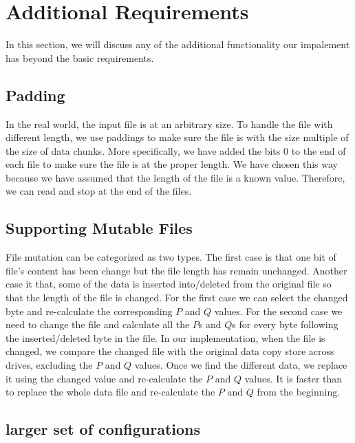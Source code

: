 \section{Additional Requirements}

In this section, we will discuss any of the additional functionality our impalement has beyond the basic requirements. 

\subsection{Padding}

In the real world, the input file is at an arbitrary size. To handle the file with different length, we use paddings to make sure the file is with the size multiple of the size of data chunks. More specifically, we have added the bits 0 to the end of each file to make sure the file is at the proper length. We have chosen this way because we have assumed that the length of the file is a known value. Therefore, we can read and stop at the end of the files. 

\subsection{Supporting Mutable Files}

File mutation can be categorized as two types. The first case is that one bit of file’s content has been change but the file length has remain unchanged. Another case it that, some of the data is inserted into/deleted from the original file so that the length of the file is changed. For the first case we can select the changed byte and re-calculate the corresponding $P$ and $Q$ values. For the second case we need to change the file and calculate all the $P$s and $Q$s for every byte following the inserted/deleted byte in the file.
In our implementation, when the file is changed, we compare the changed file with the original data copy store across drives, excluding the $P$ and $Q$ values. Once we find the different data, we replace it using the changed value and re-calculate the $P$ and $Q$ values. It is faster than to replace the whole data file and re-calculate the $P$ and $Q$ from the beginning.

\subsection{larger set of configurations}

